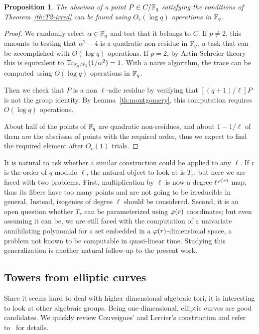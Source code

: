 \documentclass{sig-alternate}
\newtheorem{proposition}[definition]{Proposition}
\begin{document}
\begin{proposition}
  The abscissa of a point $P\in C/\mathbb{F}_q$ satisfying the
  conditions of Theorem~\ref{th:T2-irred} can be found using $O_e(\log
  q)$ operations in $\mathbb{F}_q$.
\end{proposition}
\begin{proof}
  We randomly select $\alpha\in\mathbb{F}_q$ and test that it belongs to
  $C$. If $p\ne2$, this amounts to testing that $\alpha^2-4$ is a
  quadratic non-residue in $\mathbb{F}_q$, a task that can be accomplished
  with $O(\log q)$ operations. If $p=2$, by Artin-Schreier theory
  this is equivalent to $\operatorname{Tr}_{\mathbb{F}_q/\mathbb{F}_2}(1/\alpha^2)=1$. With a
  naive algorithm, the trace can be computed using $O(\log q)$
  operations in $\mathbb{F}_q$.

  Then we check that $P$ is a non $\ell$-adic residue by verifying
  that $[(q+1)/\ell]P$ is not the group identity. By
  Lemma~\ref{th:montgomery}, this computation requires $O(\log q)$
  operations.

  About half of the points of $\mathbb{F}_q$ are quadratic non-residues, and
  about $1-1/\ell$ of them are the abscissas of points with the
  required order, thus we expect to find the required element after
  $O_e(1)$ trials.
\end{proof}

It is natural to ask whether a similar construction could be applied
to any $\ell$. If $r$ is the order of $q$ modulo $\ell$, the natural
object to look at is $T_r$, but here we are faced with two
problems. First, multiplication by $\ell$ is now a degree
$\ell^{\varphi(r)}$ map, thus its fibers have too many points and are
not going to be irreducible in general. Instead, isogenies of degree
$\ell$ should be considered. Second, it is an open question whether
$T_r$ can be parameterized using $\varphi(r)$ coordinates; but even
assuming it can be, we are still faced with the computation of a
univariate annihilating polynomial for a set embedded in a
$\varphi(r)$-dimensional space, a problem not known to be computable in
quasi-linear time. Studying this generalization is another natural
follow-up to the present work.


\subsection{Towers from elliptic curves}

Since it seems hard to deal with higher dimensional algebraic tori, it
is interesting to look at other algebraic groups. Being
one-dimensional, elliptic curves are good candidates. We quickly
review Couveignes' and Lercier's construction and refer
to~\cite{couveignes+lercier11} for details.
\end{document}
